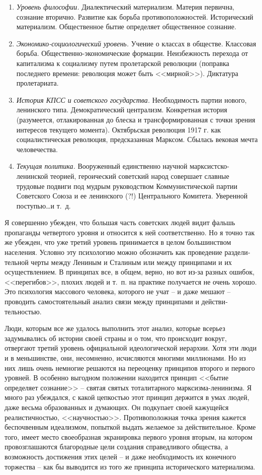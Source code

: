 \documentclass{book}
\begin{document}
\begin{enumerate}
 \item \textit{Уровень философии.}  Диалектический материализм. Материя первична, сознание вторично. Развитие как борьба 
 противоположностей. Исторический материализм. Общественное бытие определяет общественное сознание.
 \item \textit{Экономико-социологический уровень.}  Учение о классах в обществе. Классовая борьба. Общественно-экономические 
 формации. Неизбежность перехода от капитализма к социализму путем пролетарской революции (поправка последнего времени: 
 революция может быть <<мирной>>). Диктатура пролетариата.
 \item \textit{История КПСС и советского государства.} Необходимость партии нового, ленинского типа. Демократический централизм. 
 Конкретная история (разумеется, отлакированная до блеска и трансформированная с точки зрения интересов текущего момента). 
 Октябрьская революция 1917 г. как социалистиче­ская революция, предсказанная Марксом. Сбылась вековая мечта человечества.
 \item \textit{Текущая политика.}  Вооруженный единственно научной марксистско-ленинской теорией, героический советский народ 
 совершает славные трудовые подвиги под мудрым руководством Коммунистической партии Советского Союза и ее ленинского (?!) 
 Центрального Комитета. Уверенной поступью\ldots и т.~д.
\end{enumerate}

Я совершенно убежден, что большая часть советских людей видит фальшь пропаганды четвертого уровня и относится к ней 
соответственно. Но я точно так же убежден, что уже третий уровень принимается в целом большинством населения. Услов­но эту 
психологию можно обозначить как проведение раздели­тельной черты между Лениным и Сталиным или между прин­ципами и их 
осуществлением. В принципах все, в общем, верно, но вот из-за разных ошибок, <<перегибов>>, плохих людей и т.~п. на практике 
получается не очень хорошо. Это психология массо­вого человека, которого не учат -- и даже мешают -- проводить самостоятельный 
анализ связи между принципами и действи­тельностью.

Люди, которым все же удалось выполнить этот анализ, кото­рые всерьез задумывались об истории своей страны и о том, что происходит 
вокруг, отвергают третий уровень официальной идеологической иерархии. Хотя эти люди и в меньшинстве, они, несомненно, 
исчисляются многими миллионами. Но из них лишь очень немногие решаются на переоценку принципов второго и первого уровней. В 
особенно выгодном положении находится принцип <<бытие определяет сознание>> -- святая свя­тых тоталитарного марксизма-ленинизма. 
Я много раз убеж­дался, с какой цепкостью этот принцип держится в умах лю­дей, даже весьма образованных и думающих. Он подкупает 
своей кажущейся реалистичностью, <<научностью>>. Противопо­ложная точка зрения кажется беспочвенным идеализмом, по­пыткой выдать 
желаемое за действительное. Кроме того, имеет место своеобразная экранировка  первого уровня вторым, на котором провозглашаются 
благородные цели создания справедливого общества, а возможность достижения этих целей -- и даже необходимость их конечного 
торжества -- как бы вы­водится из того же принципа исторического материализма.
\end{document}
